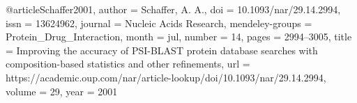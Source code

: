 @article{Schaffer2001,
author = {Schaffer, A. A.},
doi = {10.1093/nar/29.14.2994},
issn = {13624962},
journal = {Nucleic Acids Research},
mendeley-groups = {Protein{\_}Drug{\_}Interaction},
month = {jul},
number = {14},
pages = {2994--3005},
title = {{Improving the accuracy of PSI-BLAST protein database searches with composition-based statistics and other refinements}},
url = {https://academic.oup.com/nar/article-lookup/doi/10.1093/nar/29.14.2994},
volume = {29},
year = {2001}
}
